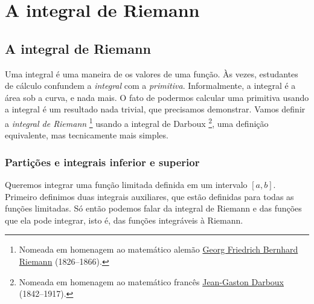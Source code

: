 \chapter{A integral de Riemann} \label{int:chapter}


\section{A integral de Riemann}
\label{sec:rint}



Uma integral é uma maneira de  os valores de uma função.
Às vezes, estudantes de cálculo confundem a \emph{integral} com a
\emph{primitiva}.
Informalmente, a integral é a área sob a curva, e nada mais.
O fato de podermos calcular uma primitiva usando a integral é um resultado
nada trivial, que precisamos demonstrar.
Vamos definir a \emph{integral de Riemann}%
\footnote{Nomeada em homenagem ao matemático alemão
\href{https://en.wikipedia.org/wiki/Riemann}{Georg Friedrich Bernhard Riemann}
(1826--1866).}
usando a integral de Darboux%
\footnote{Nomeada em homenagem ao matemático francês
\href{https://en.wikipedia.org/wiki/Darboux}{Jean-Gaston Darboux} (1842--1917).},
uma definição equivalente, mas tecnicamente mais simples.

\subsection{Partições e integrais inferior e superior}

Queremos integrar uma função limitada definida em um intervalo $[a,b]$.
Primeiro definimos duas integrais auxiliares, que estão definidas para todas
as funções limitadas. Só então podemos falar da integral de Riemann e das
funções que ela pode integrar, isto é, das funções integráveis à Riemann.

